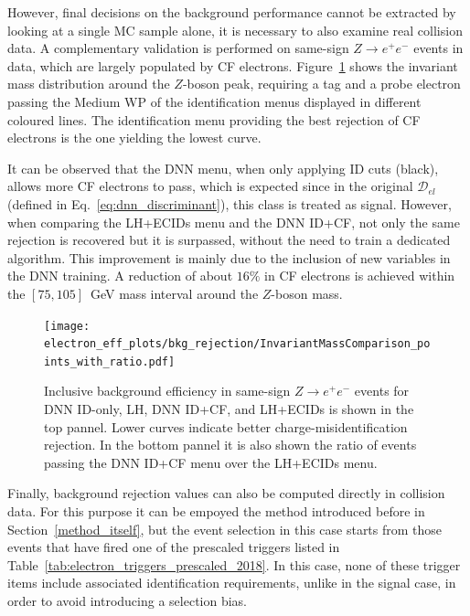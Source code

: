 
However, final decisions on the background performance cannot be extracted by looking at a single MC sample alone, it is necessary to also examine real collision data. A complementary validation is performed on same-sign $Z\to e^{+}e^{-}$ events in data, which are largely populated by CF electrons. Figure~\ref{fig:cf_bkg_data} shows the invariant mass distribution around the $Z$-boson peak, requiring a tag and a probe electron passing the Medium WP of the identification menus displayed in different coloured lines. The identification menu providing the best rejection of CF electrons is the one yielding the lowest curve. 

It can be observed that the DNN menu, when only applying ID cuts (black), allows more CF electrons to pass, which is expected since in the original $\mathcal{D}_{el}$ (defined in Eq.~\ref{eq:dnn_discriminant}), this class is treated as signal. However, when comparing the LH+ECIDs menu and the DNN ID+CF, not only the same rejection is recovered but it is surpassed, without the need to train a dedicated algorithm. This improvement is mainly due to the inclusion of new variables in the DNN training. A reduction of about $16\%$ in CF electrons is achieved within the $[75,105]$~GeV mass interval around the $Z$-boson mass.

\begin{figure}[htbp]
  \centering
  \texttt{[image: electron\_eff\_plots/bkg\_rejection/InvariantMassComparison\_points\_with\_ratio.pdf]}
  \caption{Inclusive background efficiency in same-sign $Z\to e^{+}e^{-}$ events for DNN ID-only, LH, DNN ID+CF, and LH+ECIDs is shown in the top pannel. Lower curves indicate better charge-misidentification rejection. In the bottom pannel it is also shown the ratio of events passing the DNN ID+CF menu over the LH+ECIDs menu.}
  \label{fig:cf_bkg_data}
\end{figure}

Finally, background rejection values can also be computed directly in collision data. 
For this purpose it can be empoyed the \zmass method introduced before in Section~\ref{method_itself}, but the event selection in this case starts from those events that have fired one of the prescaled triggers listed in Table~\ref{tab:electron_triggers_prescaled_2018}.  
In this case, none of these trigger items include associated identification requirements, unlike in the signal case, in order to avoid introducing a selection bias.

